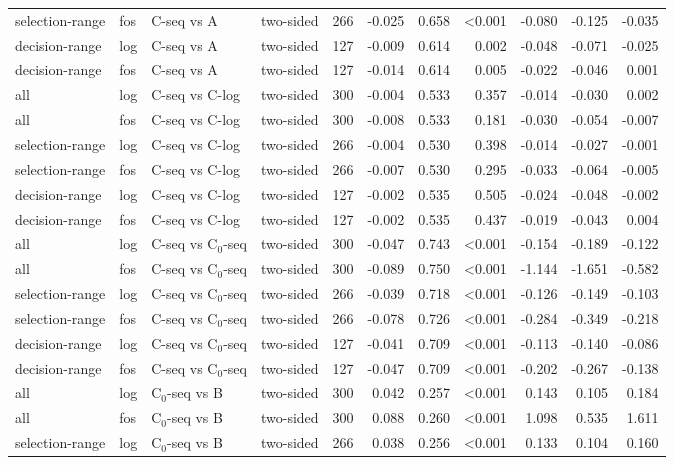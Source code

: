 \begin{longtable}{llllrrrrrrr}
selection-range & fos & C-seq vs A & two-sided & 266 & -0.025 & 0.658 & <0.001 & -0.080 & -0.125 & -0.035 \\
decision-range & log & C-seq vs A & two-sided & 127 & -0.009 & 0.614 & 0.002 & -0.048 & -0.071 & -0.025 \\
decision-range & fos & C-seq vs A & two-sided & 127 & -0.014 & 0.614 & 0.005 & -0.022 & -0.046 & 0.001 \\
all & log & C-seq vs C-log & two-sided & 300 & -0.004 & 0.533 & 0.357 & -0.014 & -0.030 & 0.002 \\
all & fos & C-seq vs C-log & two-sided & 300 & -0.008 & 0.533 & 0.181 & -0.030 & -0.054 & -0.007 \\
selection-range & log & C-seq vs C-log & two-sided & 266 & -0.004 & 0.530 & 0.398 & -0.014 & -0.027 & -0.001 \\
selection-range & fos & C-seq vs C-log & two-sided & 266 & -0.007 & 0.530 & 0.295 & -0.033 & -0.064 & -0.005 \\
decision-range & log & C-seq vs C-log & two-sided & 127 & -0.002 & 0.535 & 0.505 & -0.024 & -0.048 & -0.002 \\
decision-range & fos & C-seq vs C-log & two-sided & 127 & -0.002 & 0.535 & 0.437 & -0.019 & -0.043 & 0.004 \\
all & log & C-seq vs C$_0$-seq & two-sided & 300 & -0.047 & 0.743 & <0.001 & -0.154 & -0.189 & -0.122 \\
all & fos & C-seq vs C$_0$-seq & two-sided & 300 & -0.089 & 0.750 & <0.001 & -1.144 & -1.651 & -0.582 \\
selection-range & log & C-seq vs C$_0$-seq & two-sided & 266 & -0.039 & 0.718 & <0.001 & -0.126 & -0.149 & -0.103 \\
selection-range & fos & C-seq vs C$_0$-seq & two-sided & 266 & -0.078 & 0.726 & <0.001 & -0.284 & -0.349 & -0.218 \\
decision-range & log & C-seq vs C$_0$-seq & two-sided & 127 & -0.041 & 0.709 & <0.001 & -0.113 & -0.140 & -0.086 \\
decision-range & fos & C-seq vs C$_0$-seq & two-sided & 127 & -0.047 & 0.709 & <0.001 & -0.202 & -0.267 & -0.138 \\
all & log & C$_0$-seq vs B & two-sided & 300 & 0.042 & 0.257 & <0.001 & 0.143 & 0.105 & 0.184 \\
all & fos & C$_0$-seq vs B & two-sided & 300 & 0.088 & 0.260 & <0.001 & 1.098 & 0.535 & 1.611 \\
selection-range & log & C$_0$-seq vs B & two-sided & 266 & 0.038 & 0.256 & <0.001 & 0.133 & 0.104 & 0.160 \\

\end{longtable}
